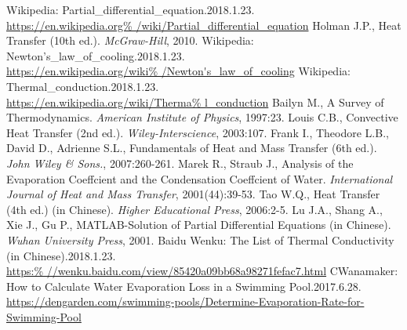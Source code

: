 \documentclass[12pt]{article}
\begin{document}
\clearpage
\begin{thebibliography}{99}
Wikipedia: Partial\_differential\_equation.2018.1.23.\\ \url{https://en.wikipedia.org%
/wiki/Partial\_differential\_equation}
Holman J.P., Heat Transfer (10th ed.). \emph{McGraw-Hill}, 2010.
Wikipedia: Newton's\_law\_of\_cooling.2018.1.23.\\ \url{https://en.wikipedia.org/wiki%
/Newton's\_law\_of\_cooling}
Wikipedia: Thermal\_conduction.2018.1.23.\\ \url{https://en.wikipedia.org/wiki/Therma%
l\_conduction}
Bailyn M., A Survey of Thermodynamics. \emph{American Institute of Physics}, 1997:23.
Louis C.B., Convective Heat Transfer (2nd ed.). \emph{Wiley-Interscience}, 2003:107.
Frank I., Theodore L.B., David D., Adrienne S.L., Fundamentals of Heat and Mass Transfer
(6th ed.). \emph{John Wiley \& Sons.}, 2007:260-261.
Marek R., Straub J., Analysis of the Evaporation Coeffcient and the Condensation
Coeffcient of Water. \emph{International Journal of Heat and Mass Transfer}, 2001(44):39-53.
Tao W.Q., Heat Transfer (4th ed.) (in Chinese). \emph{Higher Educational Press},
2006:2-5.
Lu J.A., Shang A., Xie J., Gu P., MATLAB-Solution of Partial Differential Equations (in
Chinese). \emph{Wuhan University Press}, 2001.
Baidu Wenku: The List of Thermal Conductivity (in Chinese).2018.1.23.\\ \url{https:%
//wenku.baidu.com/view/85420a09bb68a98271fefac7.html}
CWanamaker: How to Calculate Water Evaporation Loss in a Swimming Pool.2017.6.28.\\
\url{https://dengarden.com/swimming-pools/Determine-Evaporation-Rate-for-Swimming-Pool}
\end{thebibliography}
\end{document}
